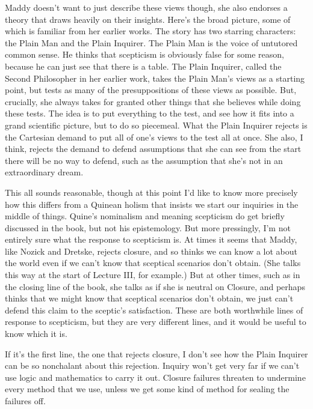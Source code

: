 \documentclass[
  10pt,
  letterpaper,
  DIV=11,
  numbers=noendperiod,
  twoside]{scrartcl}
\begin{document}
Maddy doesn't want to just describe these views though, she also
endorses a theory that draws heavily on their insights. Here's the broad
picture, some of which is familiar from her earlier works. The story has
two starring characters: the Plain Man and the Plain Inquirer. The Plain
Man is the voice of untutored common sense. He thinks that scepticism is
obviously false for some reason, because he can just see that there is a
table. The Plain Inquirer, called the Second Philosopher in her earlier
work, takes the Plain Man's views as a starting point, but tests as many
of the presuppositions of these views as possible. But, crucially, she
always takes for granted other things that she believes while doing
these tests. The idea is to put everything to the test, and see how it
fits into a grand scientific picture, but to do so piecemeal. What the
Plain Inquirer rejects is the Cartesian demand to put all of one's views
to the test all at once. She also, I think, rejects the demand to defend
assumptions that she can see from the start there will be no way to
defend, such as the assumption that she's not in an extraordinary dream.

This all sounds reasonable, though at this point I'd like to know more
precisely how this differs from a Quinean holism that insists we start
our inquiries in the middle of things. Quine's nominalism and meaning
scepticism do get briefly discussed in the book, but not his
epistemology. But more pressingly, I'm not entirely sure what the
response to scepticism is. At times it seems that Maddy, like Nozick and
Dretske, rejects closure, and so thinks we can know a lot about the
world even if we can't know that sceptical scenarios don't obtain. (She
talks this way at the start of Lecture III, for example.) But at other
times, such as in the closing line of the book, she talks as if she is
neutral on Closure, and perhaps thinks that we might know that sceptical
scenarios don't obtain, we just can't defend this claim to the sceptic's
satisfaction. These are both worthwhile lines of response to scepticism,
but they are very different lines, and it would be useful to know which
it is.

If it's the first line, the one that rejects closure, I don't see how
the Plain Inquirer can be so nonchalant about this rejection. Inquiry
won't get very far if we can't use logic and mathematics to carry it
out. Closure failures threaten to undermine every method that we use,
unless we get some kind of method for sealing the failures off.
\end{document}
